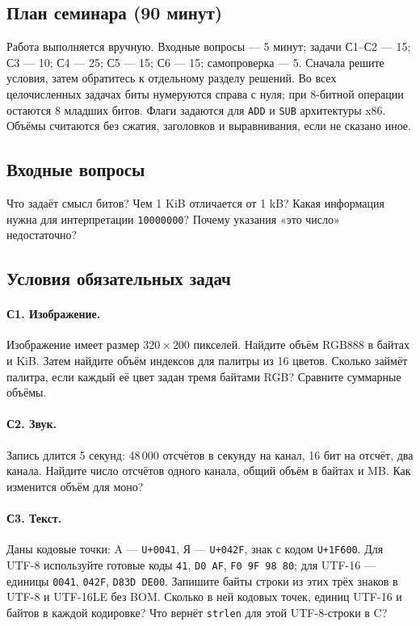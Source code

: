 \label{seminar02}
\subsection*{План семинара (90 минут)}
Работа выполняется вручную. Входные вопросы --- 5 минут; задачи С1--С2
--- 15; С3 --- 10; С4 --- 25; С5 --- 15; С6 --- 15; самопроверка --- 5.
Сначала решите условия, затем обратитесь к отдельному разделу решений.
Во всех целочисленных задачах биты нумеруются справа с нуля;
при 8-битной операции остаются 8 младших битов. Флаги задаются для
\texttt{ADD} и \texttt{SUB} архитектуры x86. Объёмы считаются без сжатия,
заголовков и выравнивания, если не сказано иное.

\subsection*{Входные вопросы}
Что задаёт смысл битов? Чем 1 KiB отличается от 1 kB?
Какая информация нужна для интерпретации \texttt{10000000}?
Почему указания «это число» недостаточно?

\subsection*{Условия обязательных задач}
\paragraph{С1. Изображение.}
Изображение имеет размер $320\times200$ пикселей.
Найдите объём RGB888 в байтах и KiB. Затем найдите объём индексов
для палитры из 16 цветов. Сколько займёт палитра, если каждый её
цвет задан тремя байтами RGB? Сравните суммарные объёмы.

\paragraph{С2. Звук.}
Запись длится 5 секунд: 48\,000 отсчётов в секунду на канал,
16 бит на отсчёт, два канала. Найдите число отсчётов одного канала,
общий объём в байтах и MB. Как изменится объём для моно?

\paragraph{С3. Текст.}
Даны кодовые точки: A --- \texttt{U+0041}, Я --- \texttt{U+042F},
знак с кодом \texttt{U+1F600}.
Для UTF-8 используйте готовые коды
\texttt{41}, \texttt{D0 AF}, \texttt{F0 9F 98 80};
для UTF-16 --- единицы \texttt{0041}, \texttt{042F}, \texttt{D83D DE00}.
Запишите байты строки из этих трёх знаков в UTF-8 и UTF-16LE без BOM.
Сколько в ней кодовых точек, единиц UTF-16 и байтов в каждой кодировке?
Что вернёт \texttt{strlen} для этой UTF-8-строки в C?

